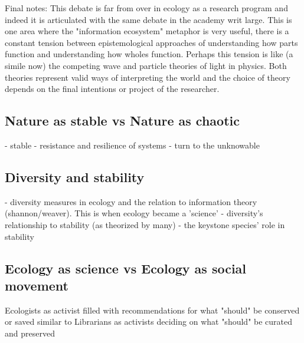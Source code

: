 Final notes: This debate is far from over in ecology as a research program and indeed it is articulated with the same debate in the academy writ large. This is one area where the "information ecosystem" metaphor is very useful, there is a constant tension between epistemological approaches of understanding how  parts function and understanding how wholes function. Perhaps this tension is like (a simile now) the competing wave and particle theories of light in physics. Both theories represent valid ways of interpreting the world and the choice of theory depends on the final intentions or project of the researcher.

\subsection{Nature as stable vs Nature as chaotic}

- stable \cite{odum_1953} 
- resistance and resilience of systems \cite{holling_1973}
- turn to the unknowable\cite{barbour_1996}

\subsection{Diversity and stability}

- diversity measures in ecology and the relation to information theory (shannon/weaver). This is when ecology became a 'science'
- diversity's relationship to stability (as theorized by many)
- the keystone species' role in stability

\subsection{Ecology as science vs Ecology as social movement}

Ecologists as activist filled with recommendations for what "should" be conserved or saved similar to Librarians as activists deciding on what "should" be curated and preserved
